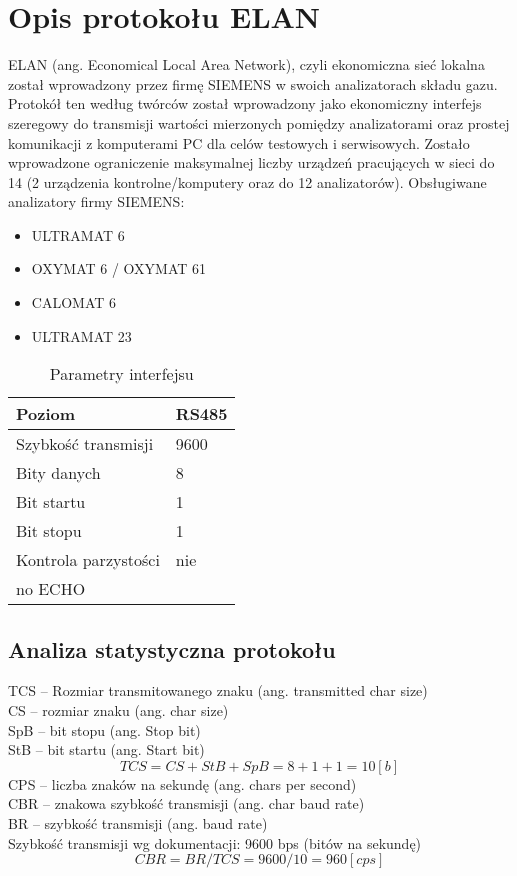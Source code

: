 \section{Opis protokołu ELAN}

ELAN (ang. Economical Local Area Network), czyli ekonomiczna sieć lokalna został wprowadzony przez firmę SIEMENS w swoich analizatorach składu gazu. Protokół ten według twórców został wprowadzony jako ekonomiczny interfejs szeregowy do transmisji wartości mierzonych pomiędzy analizatorami oraz prostej komunikacji z komputerami PC dla celów testowych i serwisowych.
Zostało wprowadzone ograniczenie maksymalnej liczby urządzeń pracujących w sieci do 14 (2 urządzenia kontrolne/komputery oraz do 12 analizatorów). Obsługiwane analizatory firmy SIEMENS:
\begin{itemize}
\item ULTRAMAT 6
\item OXYMAT 6 / OXYMAT 61
\item CALOMAT 6
\item ULTRAMAT 23
\end{itemize}

\begin{table}[h]
\centering
\begin{tabular}{|l|l|}
\hline Poziom & RS485 \\ 
\hline Szybkość transmisji & 9600 \\ 
\hline Bity danych & 8 \\ 
\hline Bit startu & 1 \\ 
\hline Bit stopu & 1 \\ 
\hline Kontrola parzystości & nie \\ 
\hline no ECHO &  \\ 
\hline 
\end{tabular} 
\caption{Parametry interfejsu}
\label{tab:parametry}
\end{table}

\subsection{Analiza statystyczna protokołu}
TCS -- Rozmiar transmitowanego znaku (ang. transmitted char size)\\
CS -- rozmiar znaku (ang. char size)\\
SpB -- bit stopu (ang. Stop bit) \\
StB -- bit startu (ang. Start bit)
$$TCS = CS + StB + SpB= 8+1+1=10 [b]$$
CPS -- liczba znaków na sekundę (ang. chars per second) \\
CBR -- znakowa szybkość transmisji (ang. char baud rate) \\
BR -- szybkość transmisji (ang. baud rate) \\
Szybkość transmisji wg dokumentacji: 9600 bps (bitów na sekundę)
$$CBR=BR/TCS=9600/10=960 [cps]$$

